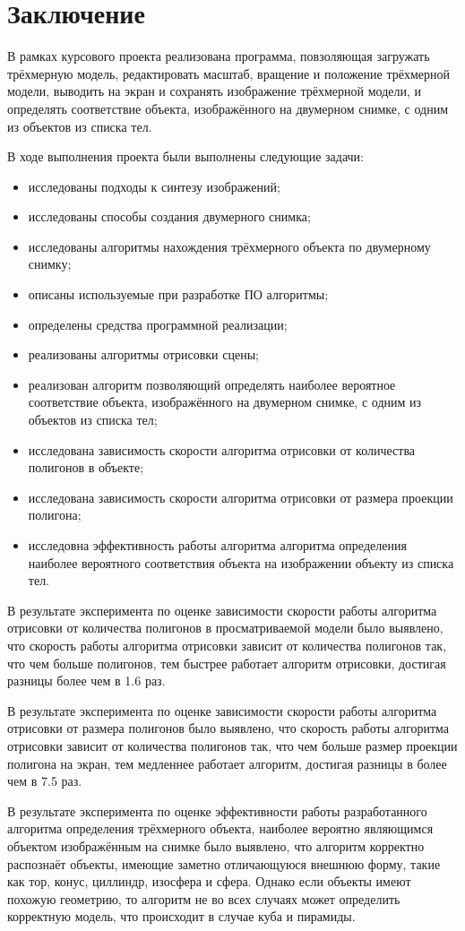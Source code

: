 \chapter*{Заключение}
В рамках курсового проекта реализована программа, повзоляющая загружать трёхмерную модель, редактировать масштаб, вращение и положение трёхмерной модели, выводить на экран и сохранять изображение трёхмерной модели, и определять соответствие объекта, изображённого на двумерном снимке, с одним из объектов из списка тел. 

В ходе выполнения проекта были выполнены следующие задачи:
\begin{itemize}
	\item исследованы подходы к синтезу изображений;
	\item исследованы способы создания двумерного снимка;
	\item исследованы алгоритмы нахождения трёхмерного объекта по двумерному снимку;
	\item описаны используемые при разработке ПО алгоритмы;
	\item определены средства программной реализации;
	\item реализованы алгоритмы отрисовки сцены;
	\item реализован алгоритм позволяющий определять наиболее вероятное соответствие объекта, изображённого на двумерном снимке, с одним из объектов из списка тел;
	\item исследована зависимость скорости алгоритма отрисовки от количества полигонов в объекте;
	\item исследована зависимость скорости алгоритма отрисовки от размера проекции полигона;
	\item исследовна эффективность работы алгоритма алгоритма определения наиболее вероятного соответствия объекта на изображении объекту из списка тел.
\end{itemize}

В результате эксперимента по оценке зависимости скорости работы алгоритма отрисовки от количества полигонов в просматриваемой модели было выявлено, что скорость работы алгоритма отрисовки зависит от количества полигонов так, что чем больше полигонов, тем быстрее работает алгоритм отрисовки, достигая разницы более чем в 1.6 раз.

В результате эксперимента по оценке зависимости скорости работы алгоритма отрисовки от размера полигонов было выявлено, что скорость работы алгоритма отрисовки зависит от количества полигонов так, что чем больше размер проекции полигона на экран, тем медленнее работает алгоритм, достигая разницы в более чем в 7.5 раз.

В результате эксперимента по оценке эффективности работы разработанного алгоритма определения трёхмерного объекта, наиболее вероятно являющимся объектом изображённым на снимке было выявлено, что алгоритм корректно распознаёт объекты, имеющие заметно отличающуюся внешнюю форму, такие как тор, конус, циллиндр, изосфера и сфера. Однако если объекты имеют похожую геометрию, то алгоритм не во всех случаях может определить корректную модель, что происходит в случае куба и пирамиды.